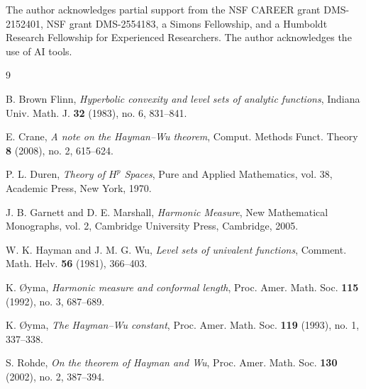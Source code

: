 \documentclass[11pt]{article}
\theoremstyle{remark}
\begin{document}
The author acknowledges partial support from the NSF CAREER grant
DMS-2152401, NSF grant DMS-2554183, a Simons Fellowship, and a Humboldt
Research Fellowship for Experienced Researchers. The author acknowledges the
use of AI tools.

\begin{thebibliography}{9}

B. Brown Flinn,
\emph{Hyperbolic convexity and level sets of analytic functions},
Indiana Univ. Math. J. \textbf{32} (1983), no. 6, 831--841.

E. Crane,
\emph{A note on the Hayman--Wu theorem},
Comput. Methods Funct. Theory \textbf{8} (2008), no. 2, 615--624.

P. L. Duren,
\emph{Theory of $H^p$ Spaces},
Pure and Applied Mathematics, vol. 38, Academic Press, New York, 1970.

J. B. Garnett and D. E. Marshall,
\emph{Harmonic Measure},
New Mathematical Monographs, vol. 2, Cambridge University Press,
Cambridge, 2005.

W. K. Hayman and J. M. G. Wu,
\emph{Level sets of univalent functions},
Comment. Math. Helv. \textbf{56} (1981), 366--403.

K. {\O}yma,
\emph{Harmonic measure and conformal length},
Proc. Amer. Math. Soc. \textbf{115} (1992), no. 3, 687--689.

K. {\O}yma,
\emph{The Hayman--Wu constant},
Proc. Amer. Math. Soc. \textbf{119} (1993), no. 1, 337--338.

S. Rohde,
\emph{On the theorem of Hayman and Wu},
Proc. Amer. Math. Soc. \textbf{130} (2002), no. 2, 387--394.

\end{thebibliography}
\end{document}
